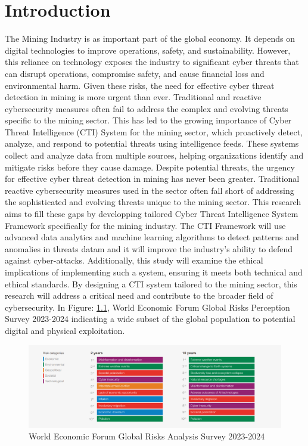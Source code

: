 \documentclass[a4paper,twoside,12pt]{report}
\begin{document}
\chapter{Introduction}
The Mining Industry is as important part of the global economy. It depends on digital technologies to improve operations, safety, and sustainability. However, this reliance on technology exposes the industry to significant cyber threats that can disrupt operations, compromise safety, and cause financial loss and environmental harm. Given these risks, the need for effective cyber threat detection in mining is more urgent than ever. Traditional and reactive cybersecurity measures often fail to address the complex and evolving threats specific to the mining sector. This has led to the growing importance of Cyber Threat Intelligence (CTI) System for the mining sector, which proactively detect, analyze, and respond to potential threats using intelligence feeds. These systems collect and analyze data from multiple sources, helping organizations identify and mitigate risks before they cause damage. Despite potential threats, the urgency for effective cyber threat detection in mining has never been greater. Traditional reactive cybersecurity measures used in the sector often fall short of addressing the sophisticated and evolving threats unique to the mining sector. This research aims to fill these gaps by developping tailored Cyber Threat Intelligence System Framework specifically for the mining industry. The CTI Framework will use advanced data analytics and machine learning algorithms to detect patterns and anomalies in threats datam and it will improve the industry’s ability to defend against cyber-attacks. Additionally, this study will examine the ethical implications of implementing such a system, ensuring it meets both technical and ethical standards. By designing a CTI system tailored to the mining sector, this research will address a critical need and contribute to the broader field of cybersecurity. In Figure: \ref{fig:thing1}, World Economic Forum Global Risks Perception Survey 2023-2024 indicating a wide subset of the global population to potential digital and physical exploitation.

\begin{figure}[ht]
    \centering
    \includegraphics[width=1.0\linewidth]{images/world-economic-forum-global-risks.png}  %
    \caption{World Economic Forum Global Risks Analysis Survey 2023-2024}
    \label{fig:thing1}
\end{figure}
\end{document}
